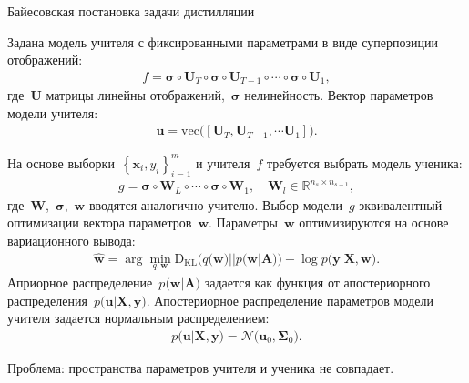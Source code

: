 \documentclass[10pt,pdf,hyperref={unicode}]{beamer}
\begin{document}

\begin{frame}{Байесовская постановка задачи дистилляции}

Задана модель учителя с фиксированными параметрами в виде суперпозиции отображений:
\[
\begin{aligned}
f = \bm{\sigma} \circ \textbf{U}_T \circ \bm{\sigma} \circ \textbf{U}_{T-1} \circ \cdots \circ \bm{\sigma} \circ \textbf{U}_1,
\end{aligned}
\]
где~$\textbf{U}$ матрицы линейны отображений,~$\bm{\sigma}$ нелинейность. Вектор параметров модели учителя:
\[
\begin{aligned}
\textbf{u} = \text{vec}\bigr(\left[\textbf{U}_T, \textbf{U}_{T-1}, \cdots \textbf{U}_1\right]\bigr).
\end{aligned}
\]

На основе выборки~$\left\{\textbf{x}_i, y_i\right\}_{i=1}^{m}$ и учителя~$f$ требуется выбрать модель ученика:
\[
\begin{aligned}
g = \bm{\sigma} \circ \textbf{W}_L \circ \cdots \circ \bm{\sigma} \circ \textbf{W}_1, \quad \textbf{W}_l \in \mathbb{R}^{n_s \times n_{s-1}},
\end{aligned}
\]
где~$\textbf{W}$,~$\bm{\sigma}$,~$\textbf{w}$ вводятся аналогично учителю. Выбор модели~$g$ эквивалентный оптимизации вектора параметров~$\textbf{w}$. Параметры~$\textbf{w}$ оптимизируются на основе вариационного вывода:
\[
\begin{aligned}
\hat{\textbf{w}} = \arg \min_{q, \textbf{w}} \text{D}_{\text{KL}}\bigr(q\bigr(\textbf{w}\bigr)||p\bigr(\textbf{w}|\textbf{A}\bigr)\bigr) - \log p\bigr(\textbf{y}|\textbf{X}, \textbf{w}\bigr).
\end{aligned}
\]
Априорное распределение~$p\bigr(\textbf{w}|\textbf{A}\bigr)$ задается как функция от апостериорного распределения~$p\bigr(\textbf{u}|\textbf{X}, \textbf{y}\bigr)$. Апостериорное распределение параметров модели учителя задается нормальным распределением:
\[
\begin{aligned}
p\bigr(\textbf{u}|\textbf{X}, \textbf{y}\bigr) = \mathcal{N}\bigr(\textbf{u}_0, \bm{\Sigma}_0\bigr).
\end{aligned}
\]

Проблема: пространства параметров учителя и ученика не совпадает.

\end{frame}
\end{document}
